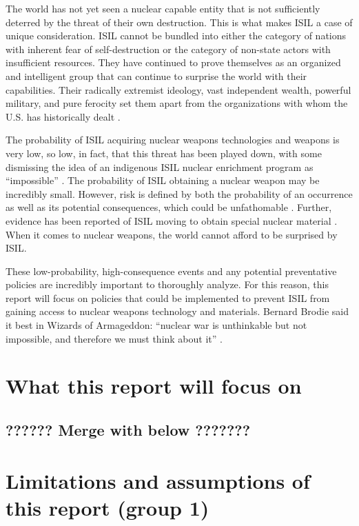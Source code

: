 \documentclass{report}
\begin{document}
The world has not yet seen a nuclear capable entity    that is not sufficiently deterred by the threat of their own destruction. This is what makes ISIL a case of unique consideration. ISIL cannot be bundled into either the category of nations with inherent fear of self-destruction or the category of non-state actors with insufficient resources. They have continued to prove themselves as an organized and intelligent group that can continue to surprise the world with their capabilities. Their radically extremist ideology, vast independent wealth, powerful military, and pure ferocity set them apart from the organizations with whom the U.S. has historically dealt  \cite{bach2015isis}. 

The probability of ISIL acquiring nuclear weapons technologies and weapons is very low, so low, in fact, that this threat has been played down, with some dismissing the idea of an indigenous ISIL nuclear enrichment program as \enquote{impossible} \cite{AlexanderSmith2014,Cirincione2014}. The probability of ISIL obtaining a nuclear weapon may be incredibly small. However, risk is defined by both the probability of an occurrence as well as its potential consequences, which could be unfathomable \cite{ONeill1997}. Further, evidence  has  been reported  of ISIL  moving to obtain special nuclear material \cite{AlexanderSmith2014}. When it comes to nuclear weapons, the world cannot afford to be  surprised by ISIL. 

These low-probability, high-consequence events and any potential preventative policies are incredibly important to thoroughly analyze. For this reason, this report will focus on policies that could be implemented to prevent ISIL from gaining access to nuclear weapons technology and materials. Bernard Brodie said it best in Wizards of Armageddon: \enquote{nuclear war is unthinkable but not impossible, and therefore we must think about it} \cite{kaplan1991wizards}.





\section{What this report will focus on}

\subsection{?????? Merge with below ??????? }

\section{Limitations and assumptions of this report (group 1)}
\end{document}
